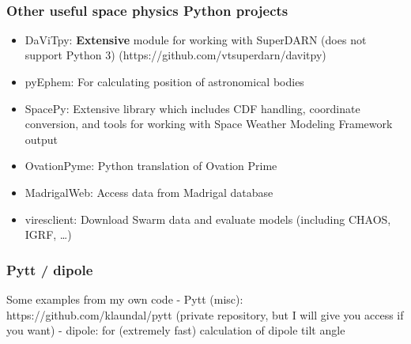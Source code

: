 \documentclass[11pt]{article}
\providecommand{\tightlist}{%
      \setlength{\itemsep}{0pt}\setlength{\parskip}{0pt}}
\begin{document}
    \begin{center}
    \end{center}
    { \hspace*{\fill} \\}
    
    \hypertarget{other-useful-space-physics-python-projects}{%
\subsubsection{Other useful space physics Python
projects}\label{other-useful-space-physics-python-projects}}

\begin{itemize}
\tightlist
\item
  DaViTpy: \textbf{Extensive} module for working with SuperDARN (does
  not support Python 3) (https://github.com/vtsuperdarn/davitpy)
\item
  pyEphem: For calculating position of astronomical bodies
\item
  SpacePy: Extensive library which includes CDF handling, coordinate
  conversion, and tools for working with Space Weather Modeling
  Framework output
\item
  OvationPyme: Python translation of Ovation Prime
\item
  MadrigalWeb: Access data from Madrigal database
\item
  viresclient: Download Swarm data and evaluate models (including CHAOS,
  IGRF, \ldots{})
\end{itemize}

    \hypertarget{pytt-dipole}{%
\subsubsection{Pytt / dipole}\label{pytt-dipole}}

Some examples from my own code - Pytt (misc):
https://github.com/klaundal/pytt (private repository, but I will give
you access if you want) - dipole: for (extremely fast) calculation of
dipole tilt angle
\end{document}
